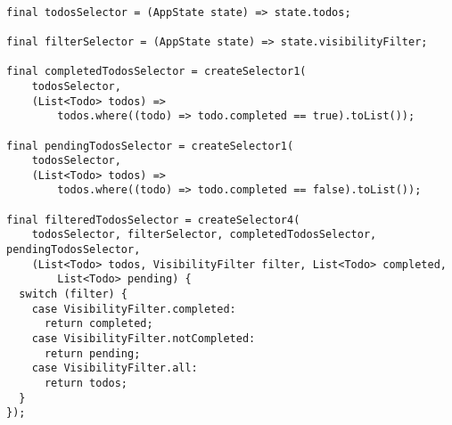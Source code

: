\begin{code}
\mbox{}\\
 \mbox{}
		\label{code:2.14}
\begin{verbatim}
final todosSelector = (AppState state) => state.todos;

final filterSelector = (AppState state) => state.visibilityFilter;

final completedTodosSelector = createSelector1(
    todosSelector,
    (List<Todo> todos) =>
        todos.where((todo) => todo.completed == true).toList());

final pendingTodosSelector = createSelector1(
    todosSelector,
    (List<Todo> todos) =>
        todos.where((todo) => todo.completed == false).toList());

final filteredTodosSelector = createSelector4(
    todosSelector, filterSelector, completedTodosSelector, pendingTodosSelector,
    (List<Todo> todos, VisibilityFilter filter, List<Todo> completed,
        List<Todo> pending) {
  switch (filter) {
    case VisibilityFilter.completed:
      return completed;
    case VisibilityFilter.notCompleted:
      return pending;
    case VisibilityFilter.all:
      return todos;
  }
});
\end{verbatim}
\mbox{}
\end{code}

